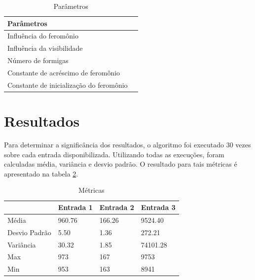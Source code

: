 \documentclass[a4paper, 12pt]{article}
\begin{document}
\begin{table}[!htb]
\centering
\caption{Parâmetros}
\label{tab1}
\begin{tabular}{|l|l|}
\hline
Parâmetros                               \\\hline
Influência do feromônio                  \\
Influência da visibilidade               \\
Número de formigas                       \\
Constante de acréscimo de feromônio      \\
Constante de inicialização do feromônio  \\\hline
\end{tabular}
\end{table}

\section{Resultados}
Para determinar a significância dos resultados, o algoritmo foi executado 30 vezes sobre cada entrada disponibilizada. Utilizando todas as execuções, foram calculadas média, variância e desvio padrão. O resultado para tais métricas é apresentado na tabela \ref{estatisticas}.

\begin{table}[!htb]
\centering
\caption{Métricas}
\label{estatisticas}
\begin{tabular}{|l|l|l|l|}
\hline
              & Entrada 1 & Entrada 2 & Entrada 3   \\\hline
Média         & 960.76    & 166.26    &  9524.40    \\
Desvio Padrão & 5.50      & 1.36      &  272.21     \\
Variância     & 30.32     & 1.85      &   74101.28   \\
Max           & 973       & 167       &   9753        \\
Min           & 953       & 163       &   8941      \\\hline
\end{tabular}
\end{table}
\end{document}
